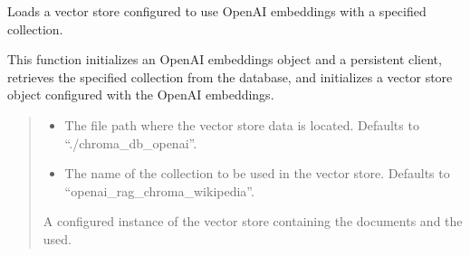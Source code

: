 \documentclass[letterpaper,10pt,english,openany,oneside]{sphinxmanual}
\begin{document}

\begin{fulllineitems}
\label{\detokenize{data_storage:tools.pipeline.load_vectorstore_openai}}
\pysigstartsignatures
{}
\pysigstopsignatures
\sphinxAtStartPar
Loads a vector store configured to use OpenAI embeddings with a specified collection.

\sphinxAtStartPar
This function initializes an OpenAI embeddings object and a persistent client, retrieves the specified
collection from the database, and initializes a  vector store object configured with
the OpenAI embeddings.
\begin{quote}\begin{description}
\begin{itemize}
\item {} 
\sphinxAtStartPar
{} \textendash{} The file path where the vector store data is located. Defaults to “./chroma\_db\_openai”.

\item {} 
\sphinxAtStartPar
{} \textendash{} The name of the collection to be used in the vector store.
Defaults to “openai\_rag\_chroma\_wikipedia”.

\end{itemize}

\sphinxAtStartPar
A configured instance of the  vector store containing the documents and the  used.

\end{description}\end{quote}

\end{fulllineitems}
\end{document}

